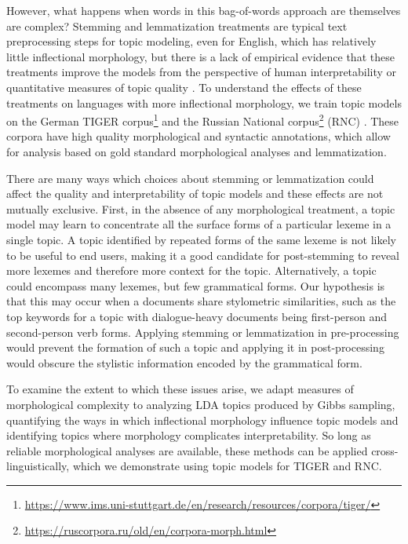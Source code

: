\documentclass[11pt,a4paper]{article}
\begin{document}
However, what happens when words in this bag-of-words approach are themselves are complex? Stemming and lemmatization treatments are typical text preprocessing steps for topic modeling, even for English, which has relatively little inflectional morphology, but there is a lack of empirical evidence that these treatments improve the models from the perspective of human interpretability or quantitative measures of topic quality \cite{schofield-mimno-2016-comparing}. To understand the effects of these treatments on languages with more inflectional morphology, we train topic models on the German TIGER corpus\footnote{\url{https://www.ims.uni-stuttgart.de/en/research/resources/corpora/tiger/}} \cite{Brants2004TIGERLI} and the Russian National corpus\footnote{\url{https://ruscorpora.ru/old/en/corpora-morph.html}} (RNC) \cite{Apresjan2006ASA}. These corpora have high quality morphological and syntactic annotations, which allow for analysis based on gold standard morphological analyses and lemmatization.

There are many ways which choices about stemming or lemmatization could affect the quality and interpretability of topic models and these effects are not mutually exclusive. First, in the absence of any morphological treatment, a topic model may learn to concentrate all the surface forms of a particular lexeme in a single topic. A topic identified by repeated forms of the same lexeme is not likely to be useful to end users, making it a good candidate for post-stemming to reveal more lexemes and therefore more context for the topic. Alternatively, a topic could encompass many lexemes, but few grammatical forms. Our hypothesis is that this may occur when a documents share stylometric similarities, such as the top keywords for a topic with dialogue-heavy documents being first-person and second-person verb forms. Applying stemming or lemmatization in pre-processing would prevent the formation of such a topic and applying it in post-processing would obscure the stylistic information encoded by the grammatical form.

To examine the extent to which these issues arise, we adapt measures of morphological complexity to analyzing LDA topics produced by Gibbs sampling, quantifying the ways in which inflectional morphology influence topic models and identifying topics where morphology complicates interpretability. So long as reliable morphological analyses are available, these methods can be applied cross-linguistically, which we demonstrate using topic models for TIGER and RNC.
\end{document}
